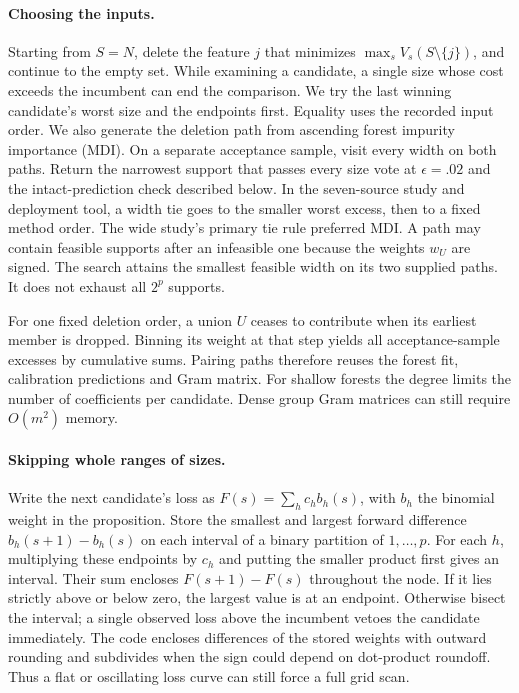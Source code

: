 \paragraph{Choosing the inputs.}
Starting from $S=N$, delete the feature $j$ that minimizes
$\max_s V_s(S\setminus\{j\})$, and continue to the empty set. While
examining a candidate, a single size whose cost exceeds the incumbent can
end the comparison. We try the last winning candidate's worst size and the
endpoints first. Equality uses the recorded input order. We also generate
the deletion path from ascending forest impurity importance (MDI).
On a separate acceptance sample, visit every width on both paths. Return
the narrowest support that passes every size vote at $\epsilon=.02$ and
the intact-prediction check described below. In the seven-source study
and deployment tool, a width tie goes to the smaller worst excess, then
to a fixed method order. The wide study's primary tie rule preferred MDI.
A path may contain
feasible supports after an infeasible one because the weights $w_U$ are
signed. The search attains the smallest feasible width on its two supplied
paths. It does not exhaust all $2^p$ supports.

For one fixed deletion order, a union $U$ ceases to contribute when its
earliest member is dropped. Binning its weight at that step yields all
acceptance-sample excesses by cumulative sums. Pairing paths therefore
reuses the forest fit, calibration predictions and Gram matrix. For shallow
forests the degree limits the number of coefficients per candidate. Dense
group Gram matrices can still require $O(m^2)$ memory.

\paragraph{Skipping whole ranges of sizes.}
Write the next candidate's loss as $F(s)=\sum_h c_h b_h(s)$, with $b_h$
the binomial weight in the proposition. Store the smallest and largest
forward difference $b_h(s+1)-b_h(s)$ on each interval of a binary partition
of $1,\ldots,p$. For each $h$, multiplying these endpoints by $c_h$ and
putting the smaller product first gives an interval. Their sum encloses
$F(s+1)-F(s)$ throughout the node. If it lies strictly above or below
zero, the largest value is at an endpoint. Otherwise bisect the interval;
a single observed loss above the incumbent vetoes the candidate immediately.
The code encloses differences of the stored weights with outward rounding
and subdivides when the sign could depend on dot-product roundoff.
Thus a flat or oscillating loss curve can still force a full grid scan.

